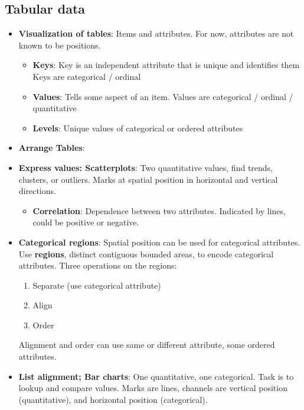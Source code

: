 \documentclass{report}
\begin{document}
    \subsection{Tabular data}
    \begin{itemize}
         \item \textbf{Visualization of tables}: Items and attributes. For now, attributes are not known to be positions.
            \begin{itemize}
                \item \textbf{Keys}: Key is an independent attribute that is unique and identifies them Keys are categorical / ordinal
                \item \textbf{Values}: Tells some aspect of an item. Values are categorical / ordinal / quantitative
                \item \textbf{Levels}: Unique values of categorical or ordered attributes
            \end{itemize}
        \item \textbf{Arrange Tables}: 
            \bigbreak \noindent 
        \item \textbf{Express values: Scatterplots}: Two quantitative values, find trends, clusters, or outliers. Marks at spatial position in horizontal and vertical directions.
            \begin{itemize}
                \item \textbf{Correlation}: Dependence between two attributes. Indicated by lines, could be positive or negative.
            \end{itemize}
        \item \textbf{Categorical regions}: Spatial position can be used for categorical attributes. Use \textbf{regions}, distinct contiguous bounded areas, to encode categorical attributes.
            \bigbreak \noindent 
            Three operations on the regions:
            \begin{enumerate}
                \item Separate (use categorical attribute)
                \item Align
                \item Order
            \end{enumerate}
            Alignment and order can use same or different attribute, some ordered attributes.
        \item \textbf{List alignment; Bar charts}: One quantitative, one categorical. Task is to lookup and compare values. Marks are lines, channels are vertical position (quantitative), and horizontal position (categorical).

\end{itemize}
\end{document}
